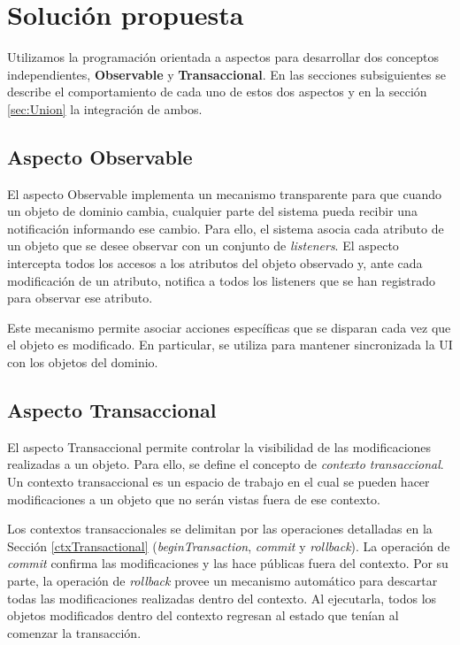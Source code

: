 \section{Solución propuesta}
\label{Solucion}

	Utilizamos la programación orientada a aspectos para desarrollar dos
	conceptos independientes, {\bf Observable} y  {\bf Transaccional}.
	En las secciones subsiguientes se describe el comportamiento de cada uno de
	estos dos aspectos y en la sección \ref{sec:Union} la integración de ambos.

	\subsection{Aspecto Observable}
	\label{aspectoObservable}
		El aspecto Observable implementa un mecanismo transparente para que cuando un
		objeto de dominio cambia, cualquier parte del sistema pueda recibir una
		notificación informando ese cambio.
		Para ello, el sistema asocia cada atributo de un objeto que se desee observar
		con un conjunto de \emph{listeners}. 
		El aspecto intercepta todos los accesos a los atributos
		del objeto observado y, ante cada modificación de un atributo, notifica a todos
		los listeners que se han registrado para observar ese atributo.
		
		Este mecanismo permite asociar acciones específicas que se disparan cada vez
		que el objeto es modificado. En particular, se utiliza para mantener
		sincronizada la UI con los objetos del dominio.

	\subsection{Aspecto Transaccional}
	\label{aspectoTransaccional}
		El aspecto Transaccional permite controlar la visibilidad de las modificaciones
		realizadas a un objeto.
		Para ello, se define el concepto de \emph{contexto transaccional}.
		Un contexto transaccional es un espacio de trabajo en el cual se pueden
		hacer modificaciones a un objeto que no serán vistas fuera de ese contexto.
	
		Los contextos transaccionales se delimitan por las
		operaciones detalladas en la Sección \ref{ctxTransactional}
		(\emph{beginTransaction}, \emph{commit} y \emph{rollback}).
		La operación de \emph{commit} confirma las modificaciones y las hace públicas
		fuera del contexto.
		Por su parte, la operación de \emph{rollback} provee un
		mecanismo automático para descartar todas las modificaciones realizadas
		dentro del contexto.
		Al ejecutarla, todos los objetos modificados dentro del contexto regresan al
		estado que tenían al comenzar la transacción.
		 
